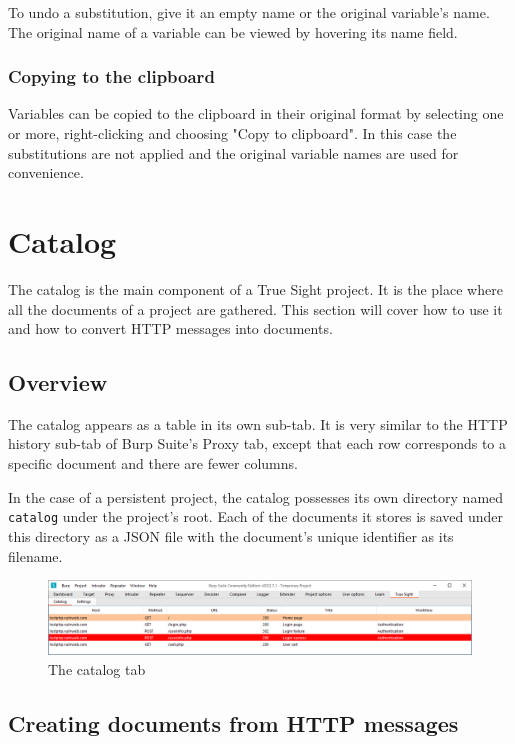 \documentclass{article}
\begin{document}
To undo a substitution, give it an empty name or the original variable's name. The original name of a variable can be viewed by hovering its name field.

\subsubsection{Copying to the clipboard}

Variables can be copied to the clipboard in their original format by selecting one or more, right-clicking and choosing "Copy to clipboard". In this case the substitutions are not applied and the original variable names are used for convenience.

\section{Catalog} \label{catalog}

The catalog is the main component of a True Sight project. It is the place where all the documents of a project are gathered. This section will cover how to use it and how to convert HTTP messages into documents. 

\subsection{Overview}

The catalog appears as a table in its own sub-tab. It is very similar to the HTTP history sub-tab of Burp Suite's Proxy tab, except that each row corresponds to a specific document and there are fewer columns.

In the case of a persistent project, the catalog possesses its own directory named \verb|catalog| under the project's root. Each of the documents it stores is saved under this directory as a JSON file with the document's unique identifier as its filename.

\begin{figure}[h]
    \centering
    \includegraphics[width=\textwidth]{assets/catalog.png}
    \caption{The catalog tab}
    \label{fig:catalog}
\end{figure}

\subsection{Creating documents from HTTP messages}
\end{document}
